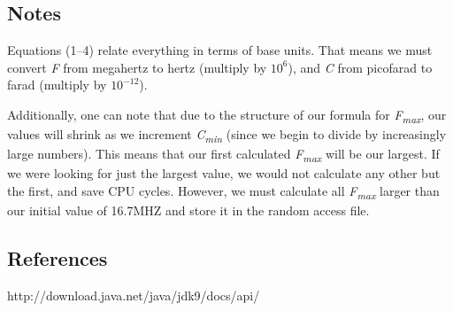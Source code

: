 \documentclass[12pt]{article}
\begin{document}
\newpage %



\begin{center}
\section{Notes}
\end{center}
Equations (1--4) relate everything in terms of base units. That means we must convert \textit{F} from megahertz to hertz (multiply by $10^6$), and \textit{C} from picofarad to farad (multiply by $10^{-12}$).
\par %
Additionally, one can note that due to the structure of our formula for \textit{F\textsubscript{max}}, our values will shrink as we increment \textit{C\textsubscript{min}} (since we begin to divide by increasingly large numbers). This means that our first calculated \textit{F\textsubscript{max}} will be our largest. If we were looking for just the largest value, we would not calculate any other but the first, and save CPU cycles. However, we must calculate all \textit{F\textsubscript{max}} larger than our initial value of 16.7MHZ and store it in the random access file.



\newpage %


\begin{center}
\section{References}
\end{center}
http://download.java.net/java/jdk9/docs/api/
\end{document}
